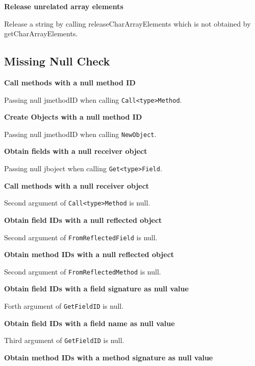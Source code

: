 \documentclass[10pt]{article}
\begin{document}
\vspace{3mm}
\noindent \textbf{Release unrelated array elements}

Release a string by calling releaseCharArrayElements which is not obtained by getCharArrayElements.

\subsection{Missing Null Check}
\vspace{3mm}
\noindent \textbf{Call methods with a null method ID}

Passing null jmethodID when calling {\tt Call<type>Method}.

\vspace{3mm}
\noindent \textbf{Create Objects with a null method ID}

Passing null jmethodID when calling {\tt NewObject}.

\vspace{3mm}
\noindent \textbf{Obtain fields with a null receiver object}

Passing null jboject when calling {\tt Get<type>Field}.

\vspace{3mm}
\noindent \textbf{Call methods with a null receiver object}

Second argument of {\tt Call<type>Method} is null.

\vspace{3mm}
\noindent \textbf{Obtain field IDs with a null reflected object}

Second argument of {\tt FromReflectedField} is null.

\vspace{3mm}
\noindent \textbf{Obtain method IDs with a null reflected object}

Second argument of {\tt FromReflectedMethod} is null.

\vspace{3mm}
\noindent \textbf{Obtain field IDs with a field signature as null value}

Forth argument of {\tt GetFieldID} is null.

\vspace{3mm}
\noindent \textbf{Obtain field IDs  with a field name as null value}

Third argument of {\tt GetFieldID} is null.

\vspace{3mm}
\noindent \textbf{Obtain method IDs with a method signature as null value}
\end{document}
